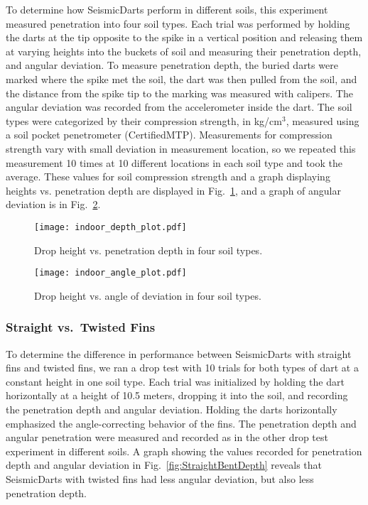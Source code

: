 To determine how SeismicDarts perform in different soils, this experiment measured penetration into four soil types. Each trial was performed by holding the darts at the tip opposite to the spike in a vertical position and releasing them at varying heights into the buckets of soil and measuring their penetration depth, and angular deviation. To measure penetration depth, the buried darts were marked where the spike met the soil, the dart was then pulled from the soil, and the distance from the spike tip to the marking was measured with calipers. The angular deviation was recorded from the accelerometer inside the dart. The soil types were categorized by their compression strength, in kg/cm$^3$, measured using a soil pocket penetrometer (CertifiedMTP). Measurements for compression strength vary with small deviation in measurement location, so we repeated this measurement 10 times at 10 different locations in each soil type and took the average. These values for soil compression strength and a graph displaying heights vs. penetration depth are displayed in Fig.~\ref{fig:DepthPlotIndoors}, and a graph of angular deviation is in Fig.~\ref{fig:AnglePlotIndoors}. 


\begin{figure} \centering
{\texttt{[image: indoor\_depth\_plot.pdf]}}
\caption{Drop height vs. penetration depth in four soil types.} 
\label{fig:DepthPlotIndoors}
\end{figure}

\begin{figure} \centering
{\texttt{[image: indoor\_angle\_plot.pdf]}}
\caption{Drop height vs. angle of deviation in four soil types.} 
\label{fig:AnglePlotIndoors}
\vspace{-1em}
\end{figure}

\subsubsection{Straight vs.\ Twisted Fins}

To determine the difference in performance between SeismicDarts with straight fins and twisted fins, we ran a drop test with 10 trials for both types of dart at a constant height in one soil type. Each trial was initialized by holding the dart horizontally at a height of 10.5 meters, dropping it into the soil, and recording the penetration depth and angular deviation. Holding the darts horizontally emphasized the angle-correcting behavior of the fins. The penetration depth and angular penetration were measured and recorded as in the other drop test experiment in different soils. A graph showing the values recorded for penetration depth and angular deviation in Fig.~\ref{fig:StraightBentDepth}  reveals that SeismicDarts with twisted fins had less angular deviation, but also less penetration depth. 

